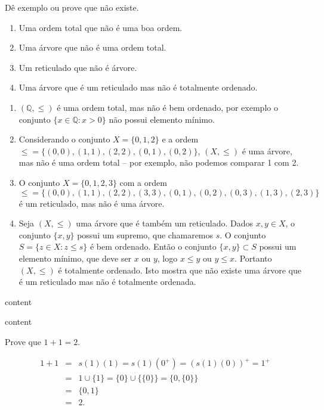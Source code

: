 \begin{exercicio}
	Dê exemplo ou prove que não existe.
	\begin{enumerate}[label=(\alph{*})]
		\item Uma ordem total que não é uma boa ordem.
		\item Uma árvore que não é uma ordem total.
		\item Um reticulado que não é árvore.
		\item Uma árvore que é um reticulado mas não é totalmente ordenado.
	\end{enumerate}
\end{exercicio}
\begin{solucao}
	\begin{enumerate}[label=(\alph{*})]
		\item $(\mathbb{Q},\leq)$ é uma ordem total, mas não é bem ordenado, por exemplo o conjunto $\{x\in\mathbb{Q}:x>0\}$ não possui elemento mínimo.
		\item Considerando o conjunto $X=\{0,1,2\}$ e a ordem $\leq=\{(0,0),(1,1),(2,2),(0,1),(0,2)\}$, $(X,\leq)$ é uma árvore, mas não é uma ordem total -- por exemplo, não podemos comparar 1 com 2.
		\item O conjunto $X=\{0,1,2,3\}$ com a ordem
		$$\leq=\{(0,0),(1,1),(2,2),(3,3),(0,1),(0,2),(0,3),(1,3),(2,3)\}$$
		é um reticulado, mas não é uma árvore.
		\item Seja $(X,\leq)$ uma árvore que é também um reticulado. Dados $x,y\in X$, o conjunto $\{x,y\}$ possui um supremo, que chamaremos $s$. O conjunto $S=\{z\in X:z\leq s\}$ é bem ordenado. Então o conjunto $\{x,y\}\subset S$ possui um elemento mínimo, que deve ser $x$ ou $y$, logo $x\leq y$ ou $y\leq x$. Portanto $(X,\leq)$ é totalmente ordenado. Isto mostra que não existe uma árvore que é um reticulado mas não é totalmente ordenada.
	\end{enumerate}
\end{solucao}

\begin{exercicio}
	content
\end{exercicio}
\begin{solucao}
	content
\end{solucao}

\begin{exercicio}
	Prove que $1+1=2$.
\end{exercicio}
\begin{solucao}
	\begin{eqnarray*}
		1+1&=&s(1)(1)=s(1)(0^+)=(s(1)(0))^+=1^+ \\
		&=&1\cup\{1\}=\{0\}\cup\{\{0\}\}=\{0,\{0\}\} \\
		&=&\{0,1\} \\
		&=&2.
	\end{eqnarray*}
\end{solucao}

